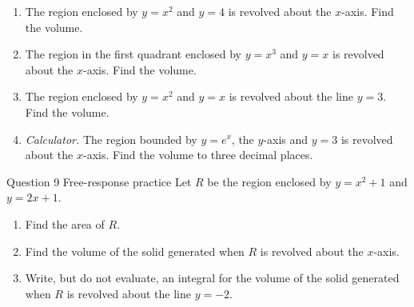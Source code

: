 \documentclass[11pt]{article}
\begin{document}
\begin{enumerate}[leftmargin=*,itemsep=2pt,start=5]
  \item The region enclosed by $y=x^2$ and $y=4$ is revolved about the $x$-axis. Find the volume.\work{2.8cm}
  \item The region in the first quadrant enclosed by $y=x^3$ and $y=x$ is revolved about the $x$-axis. Find the volume.\work{2.8cm}
  \item The region enclosed by $y=x^2$ and $y=x$ is revolved about the line $y=3$. Find the volume.\work{2.8cm}
  \item \emph{Calculator.} The region bounded by $y=e^{x}$, the $y$-axis and $y=3$ is revolved about the $x$-axis. Find the volume to three decimal places.\work{2.8cm}
\end{enumerate}

\begin{frbox}{Question 9 \textperiodcentered{} Free-response practice}
Let $R$ be the region enclosed by $y=x^2+1$ and $y=2x+1$.
\begin{enumerate}[label=(\alph*),leftmargin=*,itemsep=2pt]
  \item Find the area of $R$.\work{2.6cm}
  \item Find the volume of the solid generated when $R$ is revolved about the $x$-axis.\work{2.6cm}
  \item Write, but do not evaluate, an integral for the volume of the solid generated when $R$ is revolved about the line $y=-2$.\work{2.6cm}
\end{enumerate}
\end{frbox}
\end{document}
